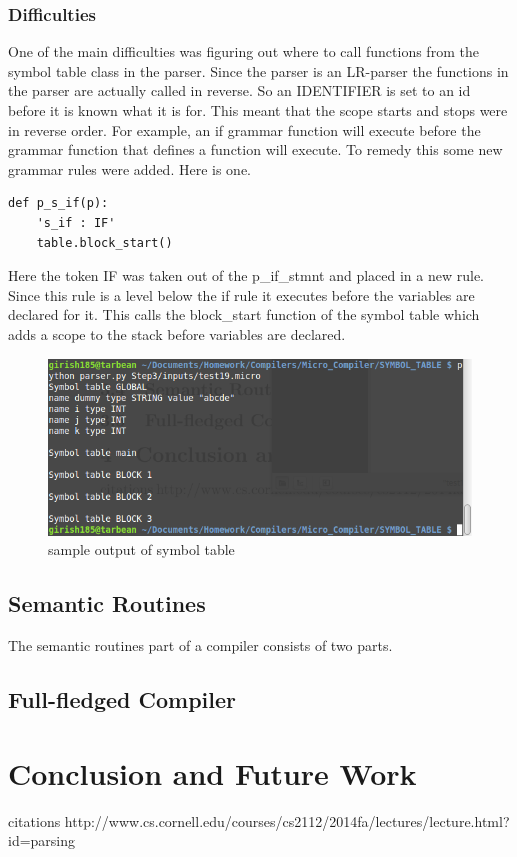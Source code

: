 \documentclass[12pt, oneside]{article}   	%
\begin{document}
\subsubsection{Difficulties}
One of the main difficulties was figuring out where to call functions from the symbol table class in the parser. Since the parser is an LR-parser the functions in the parser are actually called in reverse. So an IDENTIFIER is set to an id before it is known what it is for. This meant that the scope starts and stops were in reverse order. For example, an if grammar function will execute before the grammar function that defines a function will execute. To remedy this some new grammar rules were added. Here is one.

\begin{lstlisting}
def p_s_if(p):
	's_if : IF'
	table.block_start()
\end{lstlisting}
	Here the token IF was taken out of the p\_if\_stmnt and placed in a new rule. Since this rule is a level below the if rule it executes before the variables are declared for it. This calls the block\_start function of the symbol table which adds a scope to the stack before variables are declared.
	
	\begin{figure}[h!]
		\centerline{\includegraphics[width=.4\linewidth]{pics/sybol_output}}
		\caption{sample output of symbol table}
	\end{figure}
	
\subsection{Semantic Routines}
The semantic routines part of a compiler consists of two parts.

\subsection{Full-fledged Compiler}

\section{Conclusion and Future Work}

citations
http://www.cs.cornell.edu/courses/cs2112/2014fa/lectures/lecture.html?id=parsing
\end{document}
